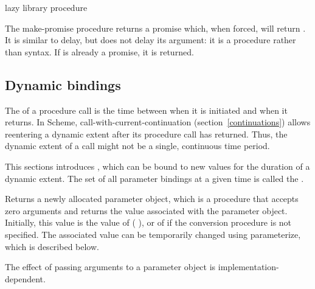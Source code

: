 \begin{entry}{%
 { }{lazy library procedure}}

The {\cf make-promise} procedure returns a promise which, when forced, will return
.  It is similar to {\cf delay}, but does not delay
its argument: it is a procedure rather than syntax.
If  is already a promise, it is returned.

\end{entry}

\subsection{Dynamic bindings}\unsection

The  of a procedure call is the time between
when it is initiated and when it returns.  In Scheme, {\cf
  call-with-current-continuation} (section~\ref{continuations}) allows
reentering a dynamic extent after its procedure call has returned.
Thus, the dynamic extent of a call might not be a single, continuous time
period.

This sections introduces , which can be
bound to new values for the duration of a dynamic extent.  The set of
all parameter bindings at a given time is called the .

\begin{entry}{%
}

Returns a newly allocated parameter object,
which is a procedure that accepts zero arguments and
returns the value associated with the parameter object.
Initially, this value is the value of
{\cf ( )}, or of 
if the conversion procedure  is not specified.
The associated value can be temporarily changed
using {\cf parameterize}, which is described below.

The effect of passing arguments to a parameter object is
implementation-dependent.
\end{entry}

